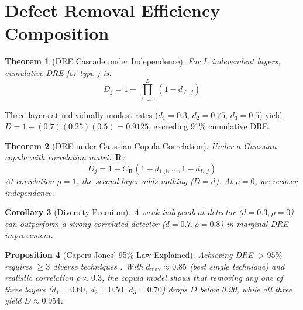 \documentclass[11pt, a4paper]{article}
\newtheorem{theorem}{Theorem}[section]
\newtheorem{proposition}[theorem]{Proposition}
\newtheorem{corollary}[theorem]{Corollary}
\theoremstyle{definition}
\theoremstyle{remark}
\begin{document}
\section{Defect Removal Efficiency Composition}
\label{sec:dre}

\begin{theorem}[DRE Cascade under Independence]
\label{thm:drecascade}
For $L$ independent layers, cumulative DRE for type $j$ is:
\begin{equation}
D_j = 1 - \prod_{\ell=1}^{L} (1 - d_{\ell,j})
\end{equation}
\end{theorem}

Three layers at individually modest rates ($d_1 = 0.3$, $d_2 = 0.75$, $d_3 = 0.5$) yield $D = 1 - (0.7)(0.25)(0.5) = 0.9125$, exceeding 91\% cumulative DRE.

\begin{theorem}[DRE under Gaussian Copula Correlation]
\label{thm:copula}
Under a Gaussian copula \citep{sklar1959} with correlation matrix $\mathbf{R}$:
\begin{equation}
D_j = 1 - C_{\mathbf{R}}(1 - d_{1,j}, \ldots, 1 - d_{L,j})
\end{equation}
At correlation $\rho = 1$, the second layer adds nothing ($D = d$). At $\rho = 0$, we recover independence.
\end{theorem}

\begin{corollary}[Diversity Premium]
\label{cor:diversity}
A weak independent detector ($d = 0.3, \rho = 0$) can outperform a strong correlated detector ($d = 0.7, \rho = 0.8$) in marginal DRE improvement.
\end{corollary}

\begin{proposition}[Capers Jones' 95\% Law Explained]
\label{prop:jones}
Achieving DRE $> 95\%$ requires ${\geq}3$ diverse techniques \citep{capersjones2012}. With $d_{\max} \approx 0.85$ (best single technique) and realistic correlation $\rho \approx 0.3$, the copula model shows that removing any one of three layers ($d_1 = 0.60$, $d_2 = 0.50$, $d_3 = 0.70$) drops $D$ below 0.90, while all three yield $D \approx 0.954$.
\end{proposition}


\end{document}

